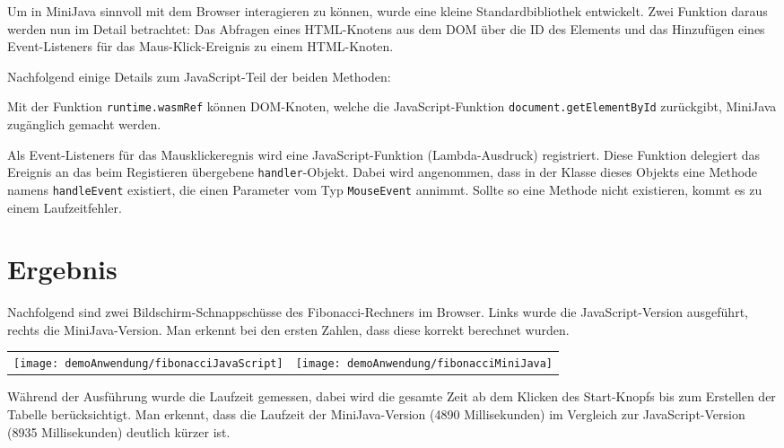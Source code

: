 Um in MiniJava sinnvoll mit dem Browser interagieren zu können, wurde eine kleine Standardbibliothek entwickelt. Zwei Funktion daraus werden nun im Detail betrachtet: Das Abfragen eines HTML-Knotens aus dem DOM über die ID des Elements und das Hinzufügen eines Event-Listeners für das Maus-Klick-Ereignis zu einem HTML-Knoten.




Nachfolgend einige Details zum JavaScript-Teil der beiden Methoden:

Mit der Funktion \lstinline{runtime.wasmRef} können DOM-Knoten, welche die Ja\-va\-Script-Funk\-tion \lstinline{document.getElementById} zurückgibt, MiniJava zugänglich gemacht werden.

Als Event-Listeners für das Mausklickeregnis wird eine JavaScript-Funktion (Lambda-Aus\-druck) registriert. Diese Funktion delegiert das Ereignis an das beim Registieren übergebene \lstinline{handler}-Objekt. Dabei wird angenommen, dass in der Klasse dieses Objekts eine Methode namens \lstinline{handleEvent} existiert, die einen Parameter vom Typ \lstinline{MouseEvent} annimmt. Sollte so eine Methode nicht existieren, kommt es zu einem Laufzeitfehler.

\section{Ergebnis}

Nachfolgend sind zwei Bildschirm-Schnappschüsse des Fibonacci-Rechners im Browser. Links wurde die JavaScript-Version ausgeführt, rechts die MiniJava-Version. Man erkennt bei den ersten Zahlen, dass diese korrekt berechnet wurden.

\begin{center}
    \begin{tabular}{c c}
        \texttt{[image: demoAnwendung/fibonacciJavaScript]} & \texttt{[image: demoAnwendung/fibonacciMiniJava]}
    \end{tabular}
\end{center}

Während der Ausführung wurde die Laufzeit gemessen, dabei wird die gesamte Zeit ab dem Klicken des Start-Knopfs bis zum Erstellen der Tabelle berücksichtigt. Man erkennt, dass die Laufzeit der MiniJava-Version (4890 Millisekunden) im Vergleich zur JavaScript-Version (8935 Millisekunden) deutlich kürzer ist.

